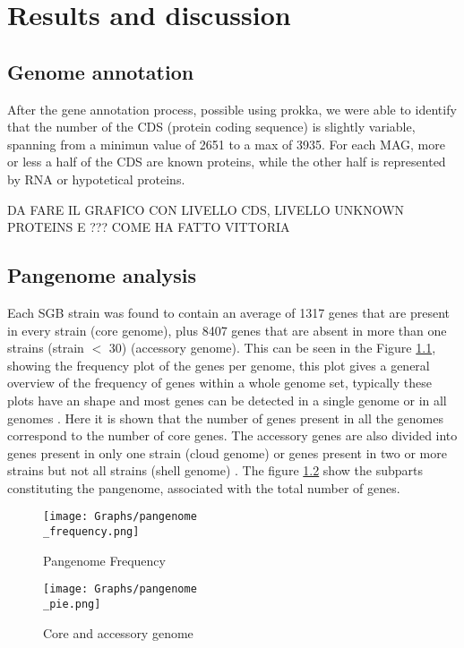 \documentclass[a4paper,titlepage]{book}
\begin{document}
\chapter{Results and discussion}


\section{Genome annotation}
After the gene annotation process, possible using prokka, we were able to identify that the number of the CDS (protein coding sequence) is slightly variable, spanning from a minimun value of 2651 to a max of 3935. For each MAG, more or less a half of the CDS are known proteins, while the other half is represented by RNA or hypotetical proteins.


DA FARE IL GRAFICO CON LIVELLO CDS, LIVELLO UNKNOWN PROTEINS E ??? COME HA FATTO VITTORIA


\section{Pangenome analysis}



Each SGB strain was found to contain an average of 1317 genes that are present in every strain (core genome), plus 8407 genes that are absent in more than one strains (strain $<$ 30) (accessory genome). This can be seen in the Figure \ref{fig:pangenome2}, showing the frequency plot of the genes per genome, this plot gives a general overview of the frequency of genes within a whole genome set, typically these plots have an shape and most genes can be detected in a single genome or in all genomes \cite{Analysis-roary}. Here it is shown that the number of genes present in all the genomes correspond to the number of core genes.
The accessory genes are also divided into genes present in only one strain (cloud genome) or genes present in two or more strains but not all strains (shell genome) \cite{Medini}. The figure \ref{fig:pangenome1} show the subparts constituting the pangenome, associated with the total number of genes.



\begin{figure}[ht]
\centering
\texttt{[image: Graphs/pangenome\\\_frequency.png]}
\caption{Pangenome Frequency}
\label{fig:pangenome2}
\end{figure}

\begin{figure}[ht]
\centering
\texttt{[image: Graphs/pangenome\\\_pie.png]}
\caption{Core and accessory genome}
\label{fig:pangenome1}
\end{figure}
\end{document}
